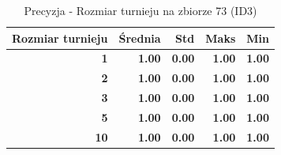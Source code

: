 \begin{table}[htbp]
\centering
\small
\setlength{\tabcolsep}{6pt}
\renewcommand{\arraystretch}{1.2}
\caption{Precyzja - Rozmiar turnieju na zbiorze 73 (ID3)}
\label{tab:ID3_tournament_size_73_precision}
\begin{tabular}{r|r|r|r|r}
\toprule
Rozmiar turnieju & Średnia & Std & Maks & Min \\
\hline
\textbf{1} & \textbf{1.00} & \textbf{0.00} & \textbf{1.00} & \textbf{1.00} \\
\textbf{2} & \textbf{1.00} & \textbf{0.00} & \textbf{1.00} & \textbf{1.00} \\
\textbf{3} & \textbf{1.00} & \textbf{0.00} & \textbf{1.00} & \textbf{1.00} \\
\textbf{5} & \textbf{1.00} & \textbf{0.00} & \textbf{1.00} & \textbf{1.00} \\
\textbf{10} & \textbf{1.00} & \textbf{0.00} & \textbf{1.00} & \textbf{1.00} \\
\bottomrule
\end{tabular}
\end{table}